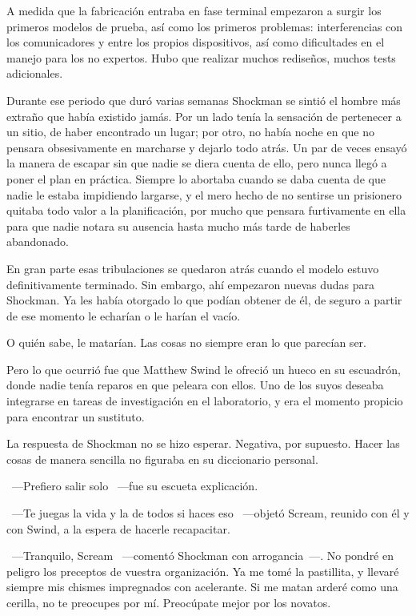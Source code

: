 A medida que la fabricación entraba en fase terminal empezaron a surgir los primeros modelos de prueba, así como los primeros problemas: interferencias con los comunicadores y entre los propios dispositivos, así como dificultades en el manejo para los no expertos. Hubo que realizar muchos rediseños, muchos tests adicionales.

Durante ese periodo que duró varias semanas Shockman se sintió el hombre más extraño que había existido jamás. Por un lado tenía la sensación de pertenecer a un sitio, de haber encontrado un lugar; por otro, no había noche en que no pensara obsesivamente en marcharse y dejarlo todo atrás. Un par de veces ensayó la manera de escapar sin que nadie se diera cuenta de ello, pero nunca llegó a poner el plan en práctica. Siempre lo abortaba cuando se daba cuenta de que nadie le estaba impidiendo largarse, y el mero hecho de no sentirse un prisionero quitaba todo valor a la planificación, por mucho que pensara furtivamente en ella para que nadie notara su ausencia hasta mucho más tarde de haberles abandonado.

En gran parte esas tribulaciones se quedaron atrás cuando el modelo estuvo definitivamente terminado. Sin embargo, ahí empezaron nuevas dudas para Shockman. Ya les había otorgado lo que podían obtener de él, de seguro a partir de ese momento le echarían o le harían el vacío.

O quién sabe, le matarían. Las cosas no siempre eran lo que parecían ser.

Pero lo que ocurrió fue que Matthew Swind le ofreció un hueco en su escuadrón, donde nadie tenía reparos en que peleara con ellos. Uno de los suyos deseaba integrarse en tareas de investigación en el laboratorio, y era el momento propicio para encontrar un sustituto.

La respuesta de Shockman no se hizo esperar. Negativa, por supuesto. Hacer las cosas de manera sencilla no figuraba en su diccionario personal.

~---Prefiero salir solo ~---fue su escueta explicación.

~---Te juegas la vida y la de todos si haces eso ~---objetó Scream, reunido con él y con Swind, a la espera de hacerle recapacitar.

~---Tranquilo, Scream ~---comentó Shockman con arrogancia~---. No pondré en peligro los preceptos de vuestra organización. Ya me tomé la pastillita, y llevaré siempre mis chismes impregnados con acelerante. Si me matan arderé como una cerilla, no te preocupes por mí. Preocúpate mejor por los novatos.

